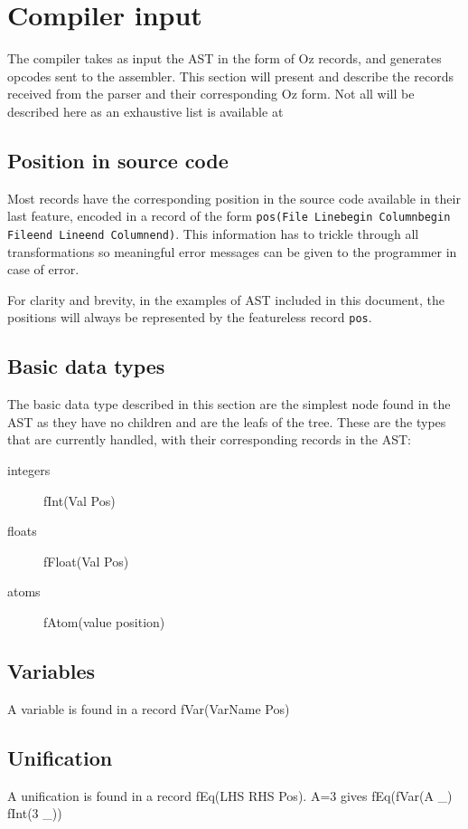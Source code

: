 \documentclass[a4paper]{memoir}
\begin{document}
\section{Compiler input}\label{section:compilerinput}
The compiler takes as input the AST in the form of Oz records, and generates opcodes sent to the assembler. 
This section will present and describe the records received from the parser and
their corresponding Oz form.
Not all will be described here as an exhaustive list is available at %
\subsection{Position in source code}
Most records have the corresponding position in the source code available in their last feature, encoded in a record of the form \lstinline!pos(File Linebegin Columnbegin Fileend Lineend Columnend)!. This information has to trickle through all transformations so meaningful error messages can be given to the programmer in case of error.

For clarity and brevity, in the examples of AST included in this document, the positions will always be represented by the featureless record \lstinline!pos!. 
\subsection{Basic data types}
The basic data type described in this section are the simplest node found in the AST as they have no children and are the leafs of the tree.
These are the types that are currently handled, with their corresponding records in the AST:
\begin{description}
  \item[integers] fInt(Val Pos)
  \item[floats] fFloat(Val Pos)
  \item[atoms] fAtom(value position)
\end{description}

\subsection{Variables}\label{sec:input:variables}
A variable is found in a record fVar(VarName Pos)

\subsection{Unification}
A unification is found in a record fEq(LHS RHS Pos).
A=3 gives fEq(fVar(A \_) fInt(3 \_))
\end{document}
